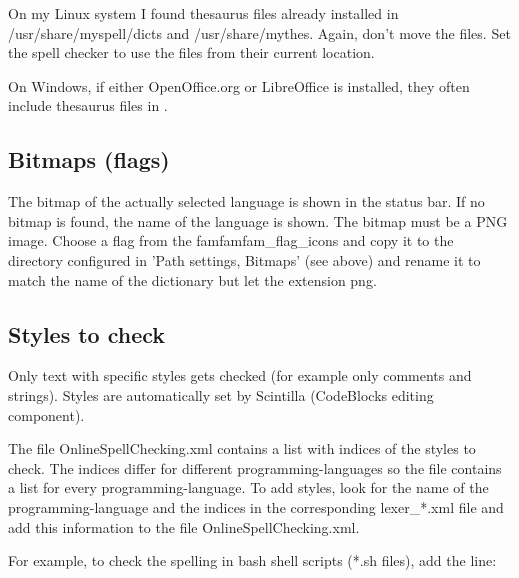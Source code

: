 On my Linux system I found thesaurus files already installed in /usr/share/myspell/dicts and /usr/share/mythes. Again, don't move the files. Set the spell checker to use the files from their current location.

On Windows, if either OpenOffice.org or LibreOffice is installed, they often include thesaurus files in . 

\subsection{Bitmaps (flags)}

The bitmap of the actually selected language is shown in the status bar. If no bitmap is found, the name of the language is shown. The bitmap must be a PNG image. Choose a flag from the famfamfam\_flag\_icons and copy it to the directory configured in 'Path settings, Bitmaps' (see above) and rename it to match the name of the dictionary but let the extension png.

\subsection{Styles to check}

Only text with specific styles gets checked (for example only comments and strings). Styles are automatically set by Scintilla (CodeBlocks editing component).

The file OnlineSpellChecking.xml contains a list with indices of the styles to check. The indices differ for different programming-languages so the file contains a list for every programming-language. To add styles, look for the name of the programming-language and the indices in the corresponding lexer\_*.xml file and add this information to the file OnlineSpellChecking.xml.

For example, to check the spelling in bash shell scripts (*.sh files), add the line: 

